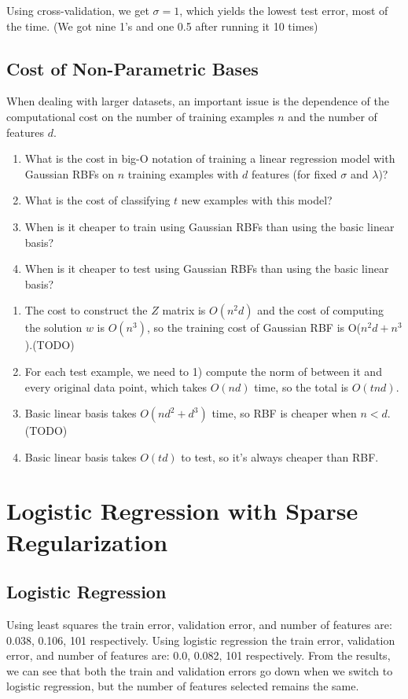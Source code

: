 \documentclass{article}
\def\blu#1{{\color{blu}#1}}
\def\enum#1{\begin{enumerate}#1\end{enumerate}}
\begin{document}
Using cross-validation, we get $\sigma = 1$, which yields the lowest test error, most of the time. (We got nine 1's and one 0.5 after running it 10 times)


\subsection{Cost of Non-Parametric Bases}

When dealing with larger datasets, an important issue is the dependence of the computational cost on the number of training examples $n$ and the number of features $d$. 
\blu{
\enum{
\item What is the cost in big-O notation of training a linear regression model with Gaussian RBFs on $n$ training examples with $d$ features (for fixed $\sigma$ and $\lambda$)? 
\item What is the cost of classifying $t$ new examples with this model? 
\item When is it cheaper to train using Gaussian RBFs than using the basic linear basis? 
\item When is it cheaper to test using Gaussian RBFs than using the basic linear basis?
}}

\enum{
\item  The cost to construct the $Z$ matrix is $O(n^2d)$ and the cost of computing the solution $w$ is $O(n^3)$, so the training cost of Gaussian RBF is O($n^2d+n^3$).(TODO)
\item For each test example, we need to 1) compute the norm of between it and every original data point, which takes $O(nd)$ time, so the total is $O(tnd)$.
\item  Basic linear basis takes $O(nd^2 + d^3)$ time, so RBF is cheaper when $ n < d$. (TODO)
 \item  Basic linear basis takes $O(td)$ to test, so it's always cheaper than RBF.
}



\section{Logistic Regression with Sparse Regularization}

\subsection{Logistic Regression}

Using least squares the train error, validation error, and number of features are: 0.038, 0.106, 101 respectively. Using logistic regression the train error, validation error, and number of features are: 0.0, 0.082, 101 respectively. From the results, we can see that both the train and validation errors go down when we switch to logistic regression, but the number of features selected remains the same.
\end{document}
